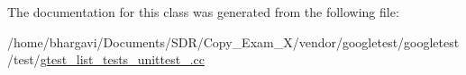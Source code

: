 The documentation for this class was generated from the following file\+:\begin{DoxyCompactItemize}
\item 
/home/bhargavi/\+Documents/\+S\+D\+R/\+Copy\+\_\+\+Exam\+\_\+X/vendor/googletest/googletest/test/\hyperlink{gtest__list__tests__unittest___8cc}{gtest\+\_\+list\+\_\+tests\+\_\+unittest\+\_\+.\+cc}\end{DoxyCompactItemize}
